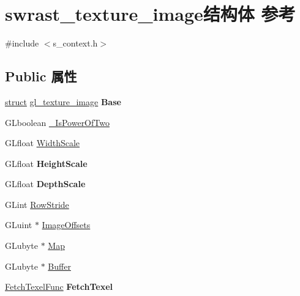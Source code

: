 \hypertarget{structswrast__texture__image}{}\section{swrast\+\_\+texture\+\_\+image结构体 参考}
\label{structswrast__texture__image}


{\ttfamily \#include $<$s\+\_\+context.\+h$>$}

\subsection*{Public 属性}
\begin{DoxyCompactItemize}
\item 
\mbox{\label{structswrast__texture__image_a1c6fa112049bb682bf47888587040905}} 
\hyperlink{interfacestruct}{struct} \hyperlink{structgl__texture__image}{gl\+\_\+texture\+\_\+image} {\bfseries Base}
\item 
G\+Lboolean \hyperlink{structswrast__texture__image_ae1f243dbb7397e242b6a7ab9b172a6bc}{\+\_\+\+Is\+Power\+Of\+Two}
\item 
G\+Lfloat \hyperlink{structswrast__texture__image_a9ad1382e2571cffcc1f7ecf9e458e9c5}{Width\+Scale}
\item 
\mbox{\label{structswrast__texture__image_aa3eec83c579cbb6ce0ee1950ce353de5}} 
G\+Lfloat {\bfseries Height\+Scale}
\item 
\mbox{\label{structswrast__texture__image_ab27a58a3da2b85294479582b71016936}} 
G\+Lfloat {\bfseries Depth\+Scale}
\item 
G\+Lint \hyperlink{structswrast__texture__image_a7f30a547544356e195fdd06d2d79c526}{Row\+Stride}
\item 
G\+Luint $\ast$ \hyperlink{structswrast__texture__image_a2727269aecf550bc87fb7af9831ca90b}{Image\+Offsets}
\item 
G\+Lubyte $\ast$ \hyperlink{structswrast__texture__image_a0fc3eaf6b6f176c2aaa6f0a8c221e65d}{Map}
\item 
G\+Lubyte $\ast$ \hyperlink{structswrast__texture__image_a543f7bbe2a4d9c54b60c05c9dc6bbf78}{Buffer}
\item 
\mbox{\label{structswrast__texture__image_a463a44d23bf59c3b3bdd429f717f92b6}} 
\hyperlink{s__context_8h_a83698752aabb7ffd9baabd0e72618393}{Fetch\+Texel\+Func} {\bfseries Fetch\+Texel}
\end{DoxyCompactItemize}


